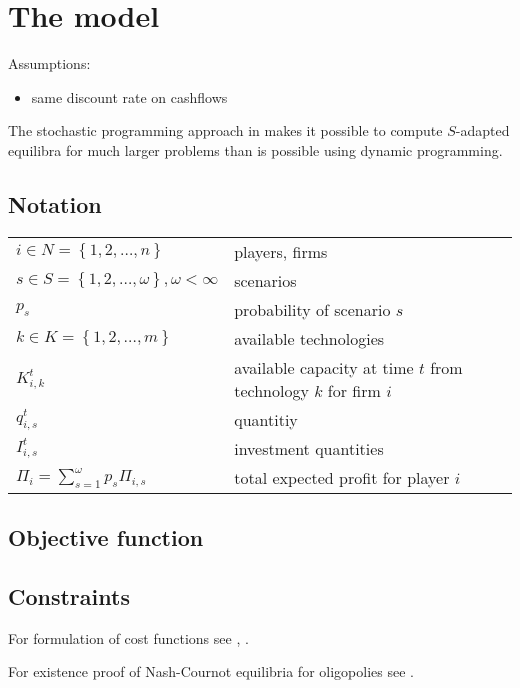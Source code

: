 \section{The model}

Assumptions:

\begin{itemize}
	\item same discount rate on cashflows
\end{itemize}

The stochastic programming approach in \cite{Genc2007} makes it possible to compute $S$-adapted equilibra for much larger problems than is possible using dynamic programming.

\subsection{Notation}

\begin{longtable}[c]{l l}
$i\in N=\left\{ 1,2,\dots,n\right\}$ & players, firms\\
$s\in S=\left\{ 1,2,\dots,\omega\right\}, \omega<\infty$ & scenarios\\
$p_s$ & probability of scenario $s$\\
$k\in K=\left\{ 1,2,\dots,m\right\}$ & available technologies\\
$K_{i,k}^t$ & available capacity at time $t$ from technology $k$ for firm $i$\\
$q_{i,s}^t$ & quantitiy\\
$I_{i,s}^t$ & investment quantities\\
$\Pi_i=\sum_{s=1}^\omega p_s\Pi_{i,s}$ & total expected profit for player $i$
\end{longtable}

\subsection{Objective function}

\subsection{Constraints}

For formulation of cost functions see \cite{Bergman1995}, \cite{Pineau2003}.	

For existence proof of Nash-Cournot equilibria for oligopolies see \cite{Murphy1982}.



